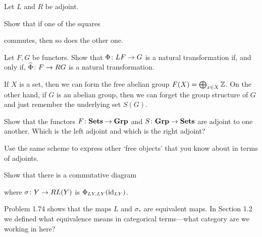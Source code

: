 \bs
\es

\bp
Let $L$ and $R$ be adjoint.
\ben[label=(\alph*)]
\item Show that if one of the squares
\bse
{}
\qquad {} \qquad
{}
\ese
commutes, then so does the other one.
\item Let $F,G$ be functors. Show that $\Phi \colon LF \to G$ is a natural transformation if, and only if, $\widehat\Phi\colon F \to RG$ is a natural transformation.
\een
\ep

\bs
\ben[label=(\alph*)]
\item
\item
\een
\es

\bx
If $X$ is a set, then we can form the free abelian group $F(X) = \bigoplus_{x\in X} \mathbb{Z}$. On the other hand, if $G$ is an abelian group, then we can forget the group structure of $G$ and just remember the underlying set $S(G)$.
\ben[label=(\alph*)]
\item Show that the functors $F \colon \mathbf{Sets} \to \mathbf{Grp}$ and $S \colon \mathbf{Grp} \to \mathbf{Sets}$ are adjoint to one another. Which is the left adjoint and which is the right adjoint?
\item Use the same scheme to express other `free objects' that you know about in terms of adjoints.
\een
\ex

\bs
\ben[label=(\alph*)]
\item
\item
\een
\es

\bp
Show that there is a commutative diagram
\bse
{}
\ese
where $\sigma\colon Y\to RL(Y)$ is $\Phi_{LY,LY}(\mathrm{id}_{LY})$.
\ep

\bs
\es

\bx
Problem 1.74 shows that the maps $L$ and $\sigma_*$ are equivalent maps. In Section 1.2 we defined what equivalence means in categorical terms---what category are we working in here?
\ex

